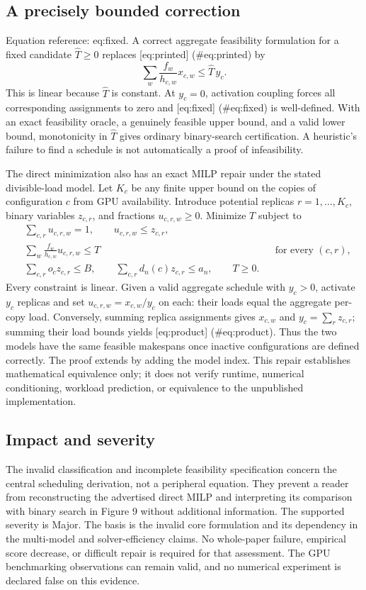 \documentclass[10pt]{article}
\begin{document}
\subsection*{A precisely bounded correction}
Equation reference: eq:fixed. A correct aggregate feasibility formulation for a fixed candidate \(\widehat T\geq0\) replaces [eq:printed] (\#eq:printed) by \[
 \sum_w \frac{f_w}{h_{c,w}}x_{c,w}\leq \widehat T\,y_c .\] This is linear because \(\widehat T\) is constant. At \(y_c=0\), activation coupling forces all corresponding assignments to zero and [eq:fixed] (\#eq:fixed) is well-defined. With an exact feasibility oracle, a genuinely feasible upper bound, and a valid lower bound, monotonicity in \(\widehat T\) gives ordinary binary-search certification. A heuristic’s failure to find a schedule is not automatically a proof of infeasibility.\par
The direct minimization also has an exact MILP repair under the stated divisible-load model. Let \(K_c\) be any finite upper bound on the copies of configuration \(c\) from GPU availability. Introduce potential replicas \(r=1,\ldots,K_c\), binary variables \(z_{c,r}\), and fractions \(u_{c,r,w}\geq0\). Minimize \(T\) subject to \[\begin{aligned}
 &\sum_{c,r}u_{c,r,w}=1,\qquad u_{c,r,w}\leq z_{c,r},\\
 &\sum_w \frac{f_w}{h_{c,w}}u_{c,r,w}\leq T
       &&\text{for every }(c,r),\\
 &\sum_{c,r}o_cz_{c,r}\leq B,\qquad
   \sum_{c,r}d_n(c)z_{c,r}\leq a_n,\qquad T\geq0 .\end{aligned}\] Every constraint is linear. Given a valid aggregate schedule with \(y_c>0\), activate \(y_c\) replicas and set \(u_{c,r,w}=x_{c,w}/y_c\) on each: their loads equal the aggregate per-copy load. Conversely, summing replica assignments gives \(x_{c,w}\) and \(y_c=\sum_rz_{c,r}\); summing their load bounds yields [eq:product] (\#eq:product). Thus the two models have the same feasible makespans once inactive configurations are defined correctly. The proof extends by adding the model index. This repair establishes mathematical equivalence only; it does not verify runtime, numerical conditioning, workload prediction, or equivalence to the unpublished implementation.\par
\subsection*{Impact and severity}
The invalid classification and incomplete feasibility specification concern the central scheduling derivation, not a peripheral equation. They prevent a reader from reconstructing the advertised direct MILP and interpreting its comparison with binary search in Figure 9 without additional information. The supported severity is Major. The basis is the invalid core formulation and its dependency in the multi-model and solver-efficiency claims. No whole-paper failure, empirical score decrease, or difficult repair is required for that assessment. The GPU benchmarking observations can remain valid, and no numerical experiment is declared false on this evidence.\par
\end{document}
